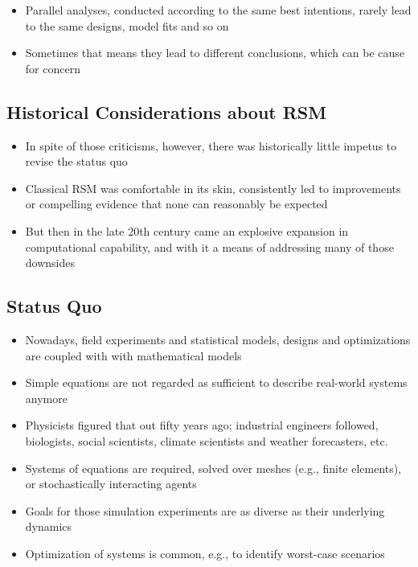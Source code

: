 \documentclass[
  letterpaper,
  DIV=11,
  numbers=noendperiod]{scrreprt}
\providecommand{\tightlist}{%
  \setlength{\itemsep}{0pt}\setlength{\parskip}{0pt}}\usepackage{longtable,booktabs,array}
\begin{document}
\begin{itemize}
  \begin{itemize}
  \tightlist
  \item
    Parallel analyses, conducted according to the same best intentions,
    rarely lead to the same designs, model fits and so on
  \item
    Sometimes that means they lead to different conclusions, which can
    be cause for concern
  \end{itemize}
\end{itemize}

\hypertarget{historical-considerations-about-rsm}{%
\subsection{Historical Considerations about
RSM}\label{historical-considerations-about-rsm}}

\begin{itemize}
\tightlist
\item
  In spite of those criticisms, however, there was historically little
  impetus to revise the status quo
\item
  Classical RSM was comfortable in its skin, consistently led to
  improvements or compelling evidence that none can reasonably be
  expected
\item
  But then in the late 20th century came an explosive expansion in
  computational capability, and with it a means of addressing many of
  those downsides
\end{itemize}

\hypertarget{status-quo}{%
\subsection{Status Quo}\label{status-quo}}

\begin{itemize}
\tightlist
\item
  Nowadays, field experiments and statistical models, designs and
  optimizations are coupled with with mathematical models
\item
  Simple equations are not regarded as sufficient to describe real-world
  systems anymore
\item
  Physicists figured that out fifty years ago; industrial engineers
  followed, biologists, social scientists, climate scientists and
  weather forecasters, etc.
\item
  Systems of equations are required, solved over meshes (e.g., finite
  elements), or stochastically interacting agents
\item
  Goals for those simulation experiments are as diverse as their
  underlying dynamics
\item
  Optimization of systems is common, e.g., to identify worst-case
  scenarios
\end{itemize}
\end{document}
